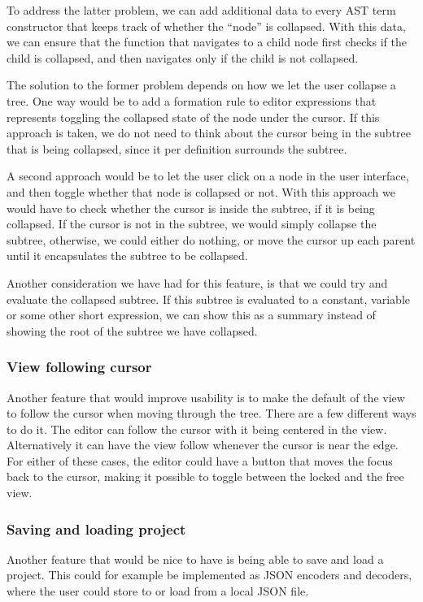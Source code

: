 To address the latter problem, we can add additional data to every AST
term constructor that keeps track of whether the ``node'' is collapsed. With
this data, we can ensure that the function that navigates to a child node first
checks if the child is collapsed, and then navigates only if the child is not
collapsed.

The solution to the former problem depends on how we let the user collapse a
tree. One way would be to add a formation rule to editor expressions that
represents toggling the collapsed state of the node under the cursor. If this
approach is taken, we do not need to think about the cursor being in the subtree
that is being collapsed, since it per definition surrounds the subtree.

A second approach would be to let the user click on a node in the user
interface, and then toggle whether that node is collapsed or not. With this
approach we would have to check whether the cursor is inside the subtree, if it
is being collapsed. If the cursor is not in the subtree, we would simply
collapse the subtree, otherwise, we could either do nothing, or move the cursor
up each parent until it encapsulates the subtree to be collapsed.

Another consideration we have had for this feature, is that we could try and
evaluate the collapsed subtree. If this subtree is evaluated to a constant,
variable or some other short expression, we can show this as a summary instead
of showing the root of the subtree we have collapsed. \\
\subsubsection{View following cursor}
Another feature that would improve usability is to make the default of the view
to follow the cursor when moving through the tree. There are a few different
ways to do it. The editor can follow the cursor with it being centered in the
view. Alternatively it can have the view follow whenever the cursor is near the
edge. For either of these cases, the editor could have a button that moves the
focus back to the cursor, making it possible to toggle between the locked and
the free view.
\subsubsection{Saving and loading project}
Another feature that would be nice to have is being able to save and load a
project. This could for example be implemented as JSON encoders and decoders,
where the user could store to or load from a local JSON file.
